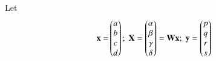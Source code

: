 
% 
Let
\begin{align}
\; \mathbf{x} = &\begin{pmatrix}a \\ b \\ c \\ d\end{pmatrix};\; \mathbf{X} = \begin{pmatrix}\alpha \\ \beta \\ \gamma \\ \delta\end{pmatrix} = \mathbf{W}\mathbf{x};\; \mathbf{y} = \begin{pmatrix}p \\ q \\ r \\ s\end{pmatrix}
\label{2019/33/dft}
\end{align}
%

